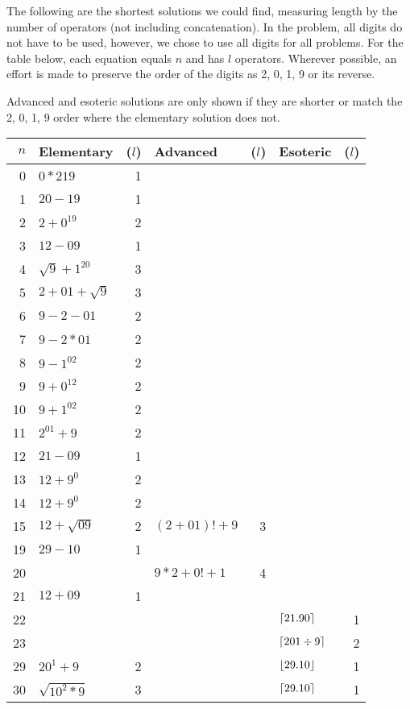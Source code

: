 The following are the shortest solutions we could find, measuring length by the number of operators (not including concatenation).
In the problem, all digits do not have to be used, however, we chose to use all digits for all problems.
For the table below, each equation equals $n$ and has $l$ operators.
Wherever possible, an effort is made to preserve the order of the digits as 2, 0, 1, 9 or its reverse.

Advanced and esoteric solutions are only shown if they are shorter or match the 2, 0, 1, 9 order where the elementary solution does not.

\begin{longtable}{r l r l r l r}
\toprule
$n$ & Elementary & ($l$) & Advanced & ($l$) & Esoteric & ($l$) \\ \midrule
\endhead%
0 & $0*219$ & 1 \\ \midrule
1 & $20-19$ & 1 \\ \midrule
2 & $2+0^{19}$ & 2 \\ \midrule
3 & $12-09$ & 1 \\ \midrule
4 & $\sqrt{9}+1^{20}$ & 3 \\ \midrule
5 & $2+01+\sqrt{9}$ & 3 \\ \midrule
6 & $9-2-01$ & 2 \\ \midrule
7 & $9-2*01$ & 2 \\ \midrule
8 & $9-1^{02}$ & 2 \\ \midrule
9 & $9+0^{12}$ & 2 \\ \midrule
\midrule
10 & $9+1^{02}$ & 2 \\ \midrule
11 & $2^{01}+9$ & 2 \\ \midrule
12 & $21-09$ & 1 \\ \midrule
13 & $12+9^0$ & 2 \\ \midrule
14 & $12+9^0$ & 2 \\ \midrule
15 & $12+\sqrt{09}$ & 2 & $(2+01)!+9$ & 3 \\ \midrule
19 & $29-10$ & 1 \\ \midrule
\midrule
20 & & & $9*2+0!+1$ & 4 \\ \midrule
21 & $12+09$ & 1 \\ \midrule
22 & & & & & $\lceil21.90\rceil$ & 1 \\ \midrule
23 & & & & & $\lceil201\div9\rceil$ & 2 \\ \midrule
29 & $20^1+9$ & 2 & & & $\lfloor29.10\rfloor$ & 1\\ \midrule
\midrule
30 & $\sqrt{10^2*9}$ & 3 & & & $\lceil29.10\rceil$ & 1\\ \midrule

\end{longtable}
